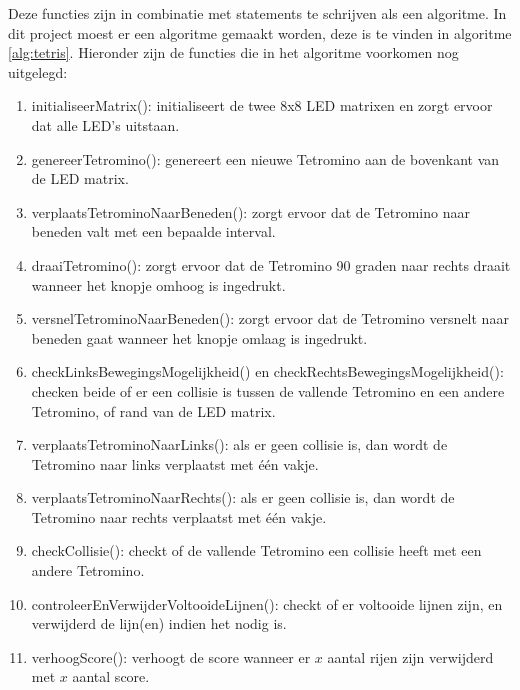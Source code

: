 Deze functies zijn in combinatie met statements te schrijven als een algoritme. 
In dit project moest er een algoritme gemaakt worden, deze is te vinden in algoritme \ref{alg:tetris}. 
Hieronder zijn de functies die in het algoritme voorkomen nog uitgelegd:
\begin{enumerate}
    \item initialiseerMatrix(): initialiseert de twee 8x8 LED matrixen en zorgt ervoor dat alle LED's uitstaan.
    \item genereerTetromino(): genereert een nieuwe Tetromino aan de bovenkant van de LED matrix.
    \item verplaatsTetrominoNaarBeneden(): zorgt ervoor dat de Tetromino naar beneden valt met een bepaalde interval.
    \item draaiTetromino(): zorgt ervoor dat de Tetromino 90 graden naar rechts draait wanneer het knopje omhoog is ingedrukt.
    \item versnelTetrominoNaarBeneden(): zorgt ervoor dat de Tetromino versnelt naar beneden gaat wanneer het knopje omlaag is ingedrukt.
    \item checkLinksBewegingsMogelijkheid() en checkRechtsBewegingsMogelijkheid(): checken beide of er een collisie is tussen de vallende Tetromino en een andere Tetromino, of rand van de LED matrix. 
    \item verplaatsTetrominoNaarLinks(): als er geen collisie is, dan wordt de Tetromino naar links verplaatst met één vakje.
    \item verplaatsTetrominoNaarRechts(): als er geen collisie is, dan wordt de Tetromino naar rechts verplaatst met één vakje.
    \item checkCollisie(): checkt of de vallende Tetromino een collisie heeft met een andere Tetromino.
    \item controleerEnVerwijderVoltooideLijnen(): checkt of er voltooide lijnen zijn, en verwijderd de lijn(en) indien het nodig is.
    \item verhoogScore(): verhoogt de score wanneer er $x$ aantal rijen zijn verwijderd met $x$ aantal score.
\end{enumerate}
\renewcommand{\algorithmicrequire}{\textbf{Input:}}
\renewcommand{\algorithmicensure}{\textbf{Output:}}
